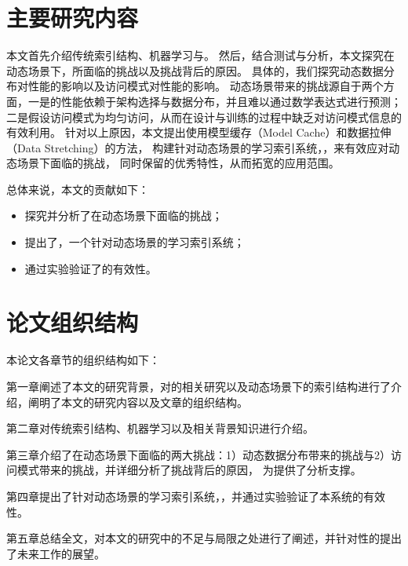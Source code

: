 \section{主要研究内容}

本文首先介绍传统索引结构、机器学习与{\li}。
然后，结合测试与分析，本文探究在动态场景下，{\li}所面临的挑战以及挑战背后的原因。
具体的，我们探究动态数据分布对{\li}性能的影响以及访问模式对{\li}性能的影响。
动态场景带来的挑战源自于两个方面，一是{\li}的性能依赖于架构选择与数据分布，并且难以通过数学表达式进行预测；
二是{\li}假设访问模式为均匀访问，从而在设计与训练的过程中缺乏对访问模式信息的有效利用。
针对以上原因，本文提出使用模型缓存（Model Cache）和数据拉伸（Data Stretching）的方法，
构建针对动态场景的学习索引系统，{\sys}，来有效应对动态场景下{\li}面临的挑战，
同时保留{\li}的优秀特性，从而拓宽{\li}的应用范围。

总体来说，本文的贡献如下：
\begin{itemize}
  \item 探究并分析了{\li}在动态场景下面临的挑战；
  \item 提出了{\sys}，一个针对动态场景的学习索引系统；
  \item 通过实验验证了{\sys}的有效性。
\end{itemize}

\section{论文组织结构}

本论文各章节的组织结构如下：

第一章阐述了本文的研究背景，对{\li}的相关研究以及动态场景下的索引结构进行了介绍，阐明了本文的研究内容以及文章的组织结构。

第二章对传统索引结构、机器学习以及{\li}相关背景知识进行介绍。

第三章介绍了在动态场景下{\li}面临的两大挑战：1）动态数据分布带来的挑战与2）访问模式带来的挑战，并详细分析了挑战背后的原因，
为{\sys}提供了分析支撑。

第四章提出了针对动态场景的学习索引系统，{\sys}，并通过实验验证了本系统的有效性。

第五章总结全文，对本文的研究中的不足与局限之处进行了阐述，并针对性的提出了未来工作的展望。
